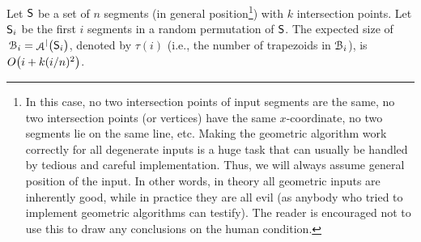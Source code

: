 \begin{lemma}
    Let $\mathsf{S}$ be a set of $n$ segments (in general
    position\footnote{In this case, no two intersection points of
       input segments are the same, no two intersection points (or
       vertices) have the same $x$-coordinate, no two segments lie on
       the same line, etc. Making the geometric algorithm work
       correctly for all degenerate inputs is a huge task that can
       usually be handled by tedious and careful implementation. Thus,
       we will always assume general position of the input. In other
       words, in theory all geometric inputs are inherently good,
       while in practice they are all evil (as anybody who tried to
       implement geometric algorithms can testify). The reader is
       encouraged not to use this to draw any conclusions on the human
       condition.})  with $k$ intersection points. Let $\mathsf{S}_i$ be
    the first $i$ segments in a random permutation of $\mathsf{S}$.  The
    expected size of $\,\ArrB_i =\ArrVD{\bigl.\SegSet_i}$, denoted by
    $\tau(i)$ (i.e., the number of trapezoids in $\EuScript{B}_i$), is
    $O\pth{ i + k (i/n)^2 }$.
\end{lemma}
